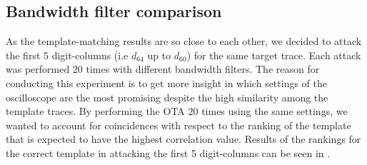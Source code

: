 \subsection{Bandwidth filter comparison}
As the template-matching results are so close to each other, we decided to attack the first 5 digit-columns (i.e $d_{64}$ up to $d_{60}$) for the same target trace.
Each attack was performed 20 times with different bandwidth filters.
The reason for conducting this experiment is to get more insight in which settings of the oscilloscope are the most promising despite the high similarity among the template traces.
By performing the OTA 20 times using the same settings, we wanted to account for coincidences with respect to the ranking of the template that is expected to have the highest correlation value.
Results of the rankings for the correct template in attacking the first 5 digit-columns can be seen in .
%
